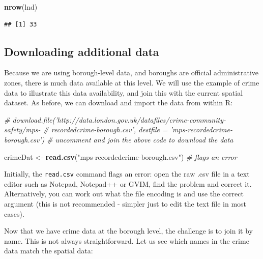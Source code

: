 \documentclass[]{article}
\newenvironment{Shaded}{}{}
\newcommand{\KeywordTok}[1]{\textcolor[rgb]{0.00,0.44,0.13}{\textbf{{#1}}}}
\newcommand{\DataTypeTok}[1]{\textcolor[rgb]{0.56,0.13,0.00}{{#1}}}
\newcommand{\DecValTok}[1]{\textcolor[rgb]{0.25,0.63,0.44}{{#1}}}
\newcommand{\StringTok}[1]{\textcolor[rgb]{0.25,0.44,0.63}{{#1}}}
\newcommand{\CommentTok}[1]{\textcolor[rgb]{0.38,0.63,0.69}{\textit{{#1}}}}
\newcommand{\NormalTok}[1]{{#1}}
\begin{document}
\begin{Shaded}
\begin{Highlighting}[]
\KeywordTok{nrow}\NormalTok{(lnd)}
\end{Highlighting}
\end{Shaded}
\begin{verbatim}
## [1] 33
\end{verbatim}
\subsection{Downloading additional data}

Because we are using borough-level data, and boroughs are official
administrative zones, there is much data available at this level. We
will use the example of crime data to illustrate this data availability,
and join this with the current spatial dataset. As before, we can
download and import the data from within R:

\begin{Shaded}
\begin{Highlighting}[]
\CommentTok{# download.file('http://data.london.gov.uk/datafiles/crime-community-safety/mps-}
\CommentTok{# recordedcrime-borough.csv', destfile = 'mps-recordedcrime-borough.csv')}
\CommentTok{# uncomment and join the above code to download the data}

\NormalTok{crimeDat <- }\KeywordTok{read.csv}\NormalTok{(}\StringTok{"mps-recordedcrime-borough.csv"}\NormalTok{)  }\CommentTok{# flags an error}
\end{Highlighting}
\end{Shaded}
Initially, the \texttt{read.csv} command flags an error: open the raw
.csv file in a text editor such as Notepad, Notepad++ or GVIM, find the
problem and correct it. Alternatively, you can work out what the file
encoding is and use the correct argument (this is not recommended -
simpler just to edit the text file in most cases).

\begin{Shaded}
\end{Shaded}
Now that we have crime data at the borough level, the challenge is to
join it by name. This is not always straightforward. Let us see which
names in the crime data match the spatial data:
\end{document}
